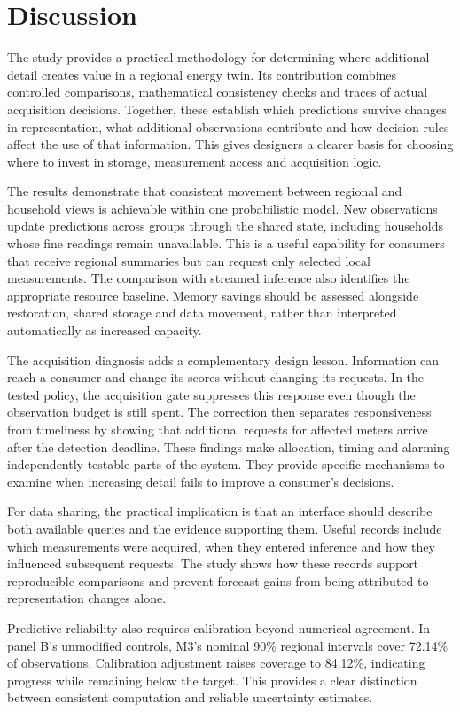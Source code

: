 \documentclass[conference]{IEEEtran}
\begin{document}
\section{Discussion}
The study provides a practical methodology for determining where additional detail creates value in a regional energy twin. Its contribution combines controlled comparisons, mathematical consistency checks and traces of actual acquisition decisions. Together, these establish which predictions survive changes in representation, what additional observations contribute and how decision rules affect the use of that information. This gives designers a clearer basis for choosing where to invest in storage, measurement access and acquisition logic.

The results demonstrate that consistent movement between regional and household views is achievable within one probabilistic model. New observations update predictions across groups through the shared state, including households whose fine readings remain unavailable. This is a useful capability for consumers that receive regional summaries but can request only selected local measurements. The comparison with streamed inference also identifies the appropriate resource baseline. Memory savings should be assessed alongside restoration, shared storage and data movement, rather than interpreted automatically as increased capacity.

The acquisition diagnosis adds a complementary design lesson. Information can reach a consumer and change its scores without changing its requests. In the tested policy, the acquisition gate suppresses this response even though the observation budget is still spent. The correction then separates responsiveness from timeliness by showing that additional requests for affected meters arrive after the detection deadline. These findings make allocation, timing and alarming independently testable parts of the system. They provide specific mechanisms to examine when increasing detail fails to improve a consumer's decisions.

For data sharing, the practical implication is that an interface should describe both available queries and the evidence supporting them. Useful records include which measurements were acquired, when they entered inference and how they influenced subsequent requests. The study shows how these records support reproducible comparisons and prevent forecast gains from being attributed to representation changes alone.

\balance
Predictive reliability also requires calibration beyond numerical agreement. In panel B's unmodified controls, M3's nominal 90\% regional intervals cover 72.14\% of observations. Calibration adjustment raises coverage to 84.12\%, indicating progress while remaining below the target. This provides a clear distinction between consistent computation and reliable uncertainty estimates.
\end{document}

